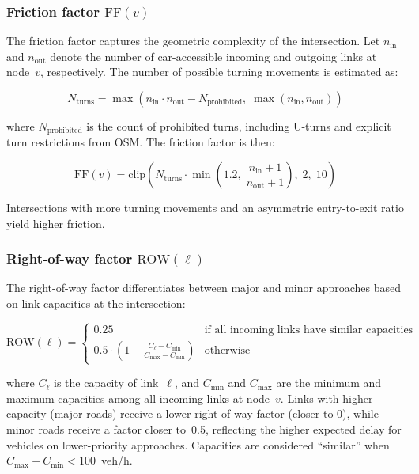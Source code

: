 \subsubsection{Friction factor $\text{FF}(v)$}

The friction factor captures the geometric complexity of the intersection. Let $n_{\text{in}}$ and $n_{\text{out}}$ denote the number of car-accessible incoming and outgoing links at node~$v$, respectively. The number of possible turning movements is estimated as:

\begin{equation}
    N_{\text{turns}} = \max\!\left(n_{\text{in}} \cdot n_{\text{out}} - N_{\text{prohibited}}, \; \max(n_{\text{in}}, n_{\text{out}})\right)
\end{equation}

\noindent where $N_{\text{prohibited}}$ is the count of prohibited turns, including U-turns and explicit turn restrictions from OSM. The friction factor is then:

\begin{equation}
    \text{FF}(v) = \text{clip}\!\left(N_{\text{turns}} \cdot \min\!\left(1.2, \; \frac{n_{\text{in}} + 1}{n_{\text{out}} + 1}\right), \; 2, \; 10\right)
    \label{eq:ff}
\end{equation}

Intersections with more turning movements and an asymmetric entry-to-exit ratio yield higher friction.

\subsubsection{Right-of-way factor $\text{ROW}(\ell)$}

The right-of-way factor differentiates between major and minor approaches based on link capacities at the intersection:

\begin{equation}
    \text{ROW}(\ell) = \begin{cases}
    0.25 & \text{if all incoming links have similar capacities} \\[4pt]
    \displaystyle 0.5 \cdot \left(1 - \frac{C_\ell - C_{\min}}{C_{\max} - C_{\min}}\right) & \text{otherwise}
    \end{cases}
    \label{eq:row}
\end{equation}

\noindent where $C_\ell$ is the capacity of link~$\ell$, and $C_{\min}$ and $C_{\max}$ are the minimum and maximum capacities among all incoming links at node~$v$. Links with higher capacity (major roads) receive a lower right-of-way factor (closer to 0), while minor roads receive a factor closer to~0.5, reflecting the higher expected delay for vehicles on lower-priority approaches. Capacities are considered ``similar'' when $C_{\max} - C_{\min} < 100$~veh/h.

